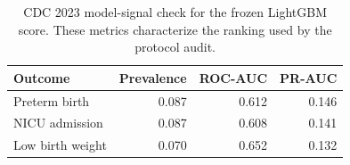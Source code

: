 \begin{table}[htbp]
\centering
\caption{CDC 2023 model-signal check for the frozen LightGBM score. These metrics characterize the ranking used by the protocol audit.}
\label{tab:model_sanity}
\small
\begin{tabular}{lrrr}
\toprule
Outcome & Prevalence & ROC-AUC & PR-AUC \\
\midrule
Preterm birth & 0.087 & 0.612 & 0.146 \\
NICU admission & 0.087 & 0.608 & 0.141 \\
Low birth weight & 0.070 & 0.652 & 0.132 \\
\bottomrule
\end{tabular}
\end{table}
